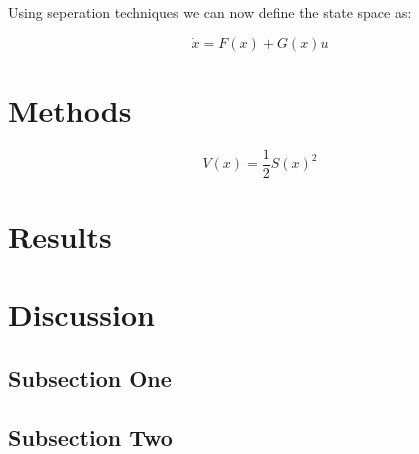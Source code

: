 \documentclass{article}
\begin{document}
Using seperation techniques we can now define the state space as:

\begin{equation}
\dot{x} = F(x) + G(x)u
\end{equation}



\section{Methods}

\begin{equation}
V(x) = \frac{1}{2}S(x)^{2}
\end{equation}


\section{Results}


\section{Discussion}

\subsection{Subsection One}

\subsection{Subsection Two}


\end{document}
